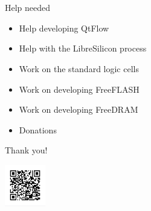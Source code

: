 \documentclass[9pt]{beamer}
\begin{document}
\section[Conclusion]{}

\begin{frame}{Help needed}
	\begin{itemize}
		\item Help developing QtFlow\footnotemark
		\item Help with the LibreSilicon process\footnotemark
		\item Work on the standard logic cells
		\item Work on developing FreeFLASH
		\item Work on developing FreeDRAM
		\item Donations
	\end{itemize}

\end{frame}

\begin{frame}{Thank you!}
	\begin{center}
		\includegraphics[width=50pt]{QRCode.png}
	\end{center}
\end{frame}
\end{document}
